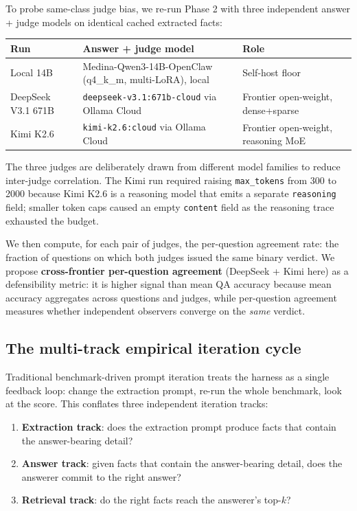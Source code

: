 \documentclass{article}
\begin{document}
To probe same-class judge bias, we re-run Phase 2 with three independent answer + judge models on identical cached extracted facts:

\begin{table}[h]
\centering
\small
\begin{tabular}{lll}
\toprule
Run                & Answer + judge model                                     & Role \\
\midrule
Local 14B          & Medina-Qwen3-14B-OpenClaw (q4\_k\_m, multi-LoRA), local  & Self-host floor \\
DeepSeek V3.1 671B & \texttt{deepseek-v3.1:671b-cloud} via Ollama Cloud       & Frontier open-weight, dense+sparse \\
Kimi K2.6          & \texttt{kimi-k2.6:cloud} via Ollama Cloud                & Frontier open-weight, reasoning MoE \\
\bottomrule
\end{tabular}
\end{table}

The three judges are deliberately drawn from different model families to reduce inter-judge correlation. The Kimi run required raising \texttt{max\_tokens} from 300 to 2000 because Kimi K2.6 is a reasoning model that emits a separate \texttt{reasoning} field; smaller token caps caused an empty \texttt{content} field as the reasoning trace exhausted the budget.

We then compute, for each pair of judges, the per-question agreement rate: the fraction of questions on which both judges issued the same binary verdict. We propose \textbf{cross-frontier per-question agreement} (DeepSeek + Kimi here) as a defensibility metric: it is higher signal than mean QA accuracy because mean accuracy aggregates across questions and judges, while per-question agreement measures whether independent observers converge on the \emph{same} verdict.

\subsection{The multi-track empirical iteration cycle}
\label{sec:multitrack}

Traditional benchmark-driven prompt iteration treats the harness as a single feedback loop: change the extraction prompt, re-run the whole benchmark, look at the score. This conflates three independent iteration tracks:

\begin{enumerate}
  \item \textbf{Extraction track}: does the extraction prompt produce facts that contain the answer-bearing detail?
  \item \textbf{Answer track}: given facts that contain the answer-bearing detail, does the answerer commit to the right answer?
  \item \textbf{Retrieval track}: do the right facts reach the answerer's top-$k$?
\end{enumerate}
\end{document}
